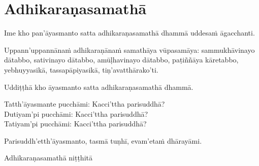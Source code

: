 \section{Adhikaraṇasamathā}
\label{adhi}

\begin{intro}
  Ime kho pan'āyasmanto satta adhikaraṇasamathā dhammā uddesaṁ āgacchanti.
\end{intro}

Uppann'uppannānaṁ adhikaraṇānaṁ samathāya vūpasamāya: sammukhāvinayo dātabbo, sativinayo dātabbo, amūḷhavinayo dātabbo, paṭiññāya kāretabbo, yebhuyyasikā, tassapāpiyasikā, tiṇ'avatthārako'ti.

\medskip

\begin{center}
Uddiṭṭhā kho āyasmanto satta adhikaraṇasamathā dhammā.

\smallskip

Tatth'āyasmante pucchāmi: Kacci'ttha parisuddhā?\\
Dutiyam'pi pucchāmi: Kacci'ttha parisuddhā?\\
Tatiyam'pi pucchāmi: Kacci'ttha parisuddhā?

\smallskip

Parisuddh'etth'āyasmanto, tasmā tuṇhī, evam'etaṁ dhārayāmi.
\end{center}

\begin{outro}
  Adhikaraṇasamathā niṭṭhitā
\end{outro}

\clearpage
